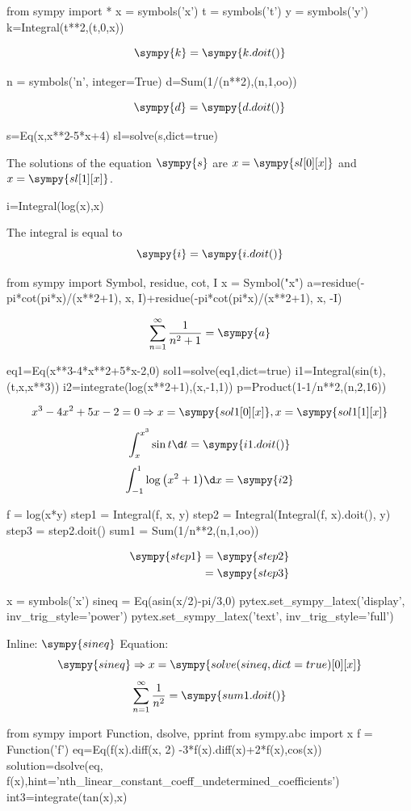 \documentclass[a4paper,11pt]{article}
\begin{document}
\begin{sympycode}
from sympy import *
x = symbols('x')
t = symbols('t')
y = symbols('y')
k=Integral(t**2,(t,0,x))
\end{sympycode}
\[ \sympy{k}=\sympy{k.doit()} \]
\begin{sympycode}
n = symbols('n', integer=True)
d=Sum(1/(n**2),(n,1,oo))
\end{sympycode}
\[ \sympy{d}=\sympy{d.doit()} \]
\begin{sympycode}
s=Eq(x,x**2-5*x+4)
sl=solve(s,dict=true)
\end{sympycode}
The solutions of the equation $ \sympy{s} $ are $ x=\sympy{sl[0][x]} $ and $ x=\sympy{sl[1][x]} $.\\
\begin{sympycode}
i=Integral(log(x),x)
\end{sympycode}
The integral is equal to \[ \sympy{i}=\sympy{i.doit()} \]
\begin{sympycode}
from sympy import Symbol, residue, cot, I
x = Symbol("x")
a=residue(-pi*cot(pi*x)/(x**2+1), x, I)+residue(-pi*cot(pi*x)/(x**2+1), x, -I)
\end{sympycode}
\[ \sum_{n=1}^{\infty}{\frac{1}{n^2+1}}=\sympy{a} \]
\begin{sympycode}
eq1=Eq(x**3-4*x**2+5*x-2,0)
sol1=solve(eq1,dict=true)
i1=Integral(sin(t),(t,x,x**3))
i2=integrate(log(x**2+1),(x,-1,1))
p=Product(1-1/n**2,(n,2,16))
\end{sympycode}
\[ x^3-4x^2+5x-2=0\Rightarrow x=\sympy{sol1[0][x]},x=\sympy{sol1[1][x]} \]
\[ \int_{x}^{x^3}{\sin{t}\d t}=\sympy{i1.doit()} \]
\[ \int_{-1}^{1}{\log{\left(x^2+1\right)}\d x}=\sympy{i2} \]
\begin{sympycode}
f = log(x*y)
step1 = Integral(f, x, y)
step2 = Integral(Integral(f, x).doit(), y)
step3 = step2.doit()
sum1 = Sum(1/n**2,(n,1,oo))
\end{sympycode}
\begin{align*}
\sympy{step1} &= \sympy{step2} \\
&= \sympy{step3}
\end{align*}
\begin{sympycode}
x = symbols('x')
sineq = Eq(asin(x/2)-pi/3,0)
pytex.set_sympy_latex('display',
inv_trig_style='power')
pytex.set_sympy_latex('text',
inv_trig_style='full')
\end{sympycode}
Inline: $\sympy{sineq}$
Equation: \[ \sympy{sineq}\Rightarrow x=\sympy{solve(sineq,dict=true)[0][x]} \]
\[ \sum_{n=1}^{\infty}\frac{1}{n^2}=\sympy{sum1.doit()} \]
\begin{sympycode}
from sympy import Function, dsolve, pprint
from sympy.abc import x
f = Function('f')
eq=Eq(f(x).diff(x, 2) -3*f(x).diff(x)+2*f(x),cos(x))
solution=dsolve(eq, f(x),hint='nth_linear_constant_coeff_undetermined_coefficients')
int3=integrate(tan(x),x)
\end{sympycode}
\end{document}
